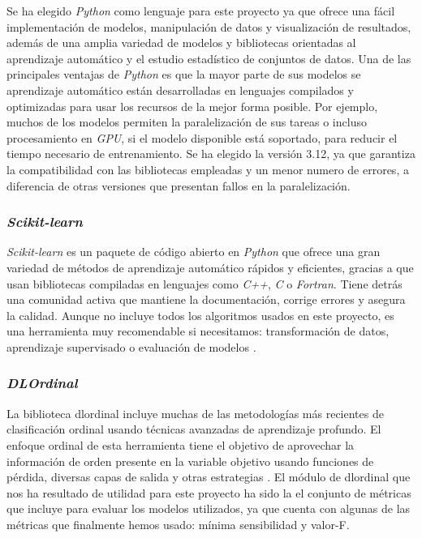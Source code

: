 Se ha elegido \textit{Python} como lenguaje para este proyecto ya que ofrece una fácil implementación de modelos, manipulación de datos y visualización de resultados, además de una amplia variedad de modelos y bibliotecas orientadas al aprendizaje automático y el estudio estadístico de conjuntos de datos. Una de las principales ventajas de \textit{Python} es que la mayor parte de sus modelos se aprendizaje automático están desarrolladas en lenguajes compilados y optimizadas para usar los recursos de la mejor forma posible. Por ejemplo, muchos de los modelos permiten la paralelización de sus tareas o incluso procesamiento en \textit{GPU}, si el modelo disponible está soportado, para reducir el tiempo necesario de entrenamiento. Se ha elegido la versión 3.12, ya que garantiza la compatibilidad con las bibliotecas empleadas y un menor numero de errores, a diferencia de otras versiones que presentan fallos en la paralelización.

\subsubsection{\textit{Scikit-learn}}
\label{subsubsec:sklearn}

\textit{Scikit-learn} es un paquete de código abierto en \textit{Python} que ofrece una gran variedad de métodos de aprendizaje automático rápidos y eficientes, gracias a que usan bibliotecas compiladas en lenguajes como \textit{C++}, \textit{C} o \textit{Fortran}. Tiene detrás una comunidad activa que mantiene la documentación, corrige errores y asegura la calidad. Aunque no incluye todos los algoritmos usados en este proyecto, es una herramienta muy recomendable si necesitamos: transformación de datos, aprendizaje supervisado o evaluación de modelos \cite{hao2019scikit}.

\subsubsection{\textit{DLOrdinal}}
\label{subsubsec:dlordinal}

La biblioteca dlordinal incluye muchas de las metodologías más recientes de clasificación ordinal usando técnicas avanzadas de aprendizaje profundo. El enfoque ordinal de esta herramienta tiene el objetivo de aprovechar la información de orden presente en la variable objetivo usando funciones de pérdida, diversas capas de salida y otras estrategias \cite{dlordinal}. El módulo de dlordinal que nos ha resultado de utilidad para este proyecto ha sido la el conjunto de métricas que incluye para evaluar los modelos utilizados, ya que cuenta con algunas de las métricas que finalmente hemos usado: mínima sensibilidad y valor-F.

